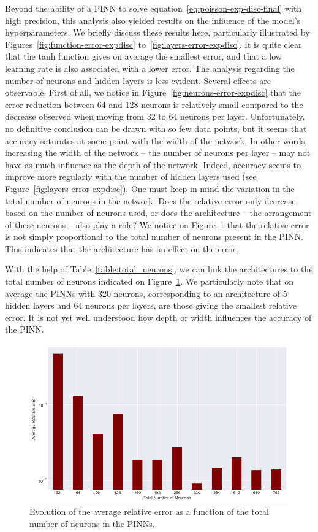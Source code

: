 Beyond the ability of a PINN to solve equation~\eqref{eq:poisson-exp-disc-final} with high precision, this analysis also yielded results on the influence of the model's hyperparameters. We briefly discuss these results here, particularly illustrated by Figures~\ref{fig:function-error-expdisc} to~\ref{fig:layers-error-expdisc}. It is quite clear that the tanh function gives on average the smallest error, and that a low learning rate is also associated with a lower error. The analysis regarding the number of neurons and hidden layers is less evident. Several effects are observable. First of all, we notice in Figure~\ref{fig:neurons-error-expdisc} that the error reduction between 64 and 128 neurons is relatively small compared to the decrease observed when moving from 32 to 64 neurons per layer. Unfortunately, no definitive conclusion can be drawn with so few data points, but it seems that accuracy saturates at some point with the width of the network. In other words, increasing the width of the network -- the number of neurons per layer -- may not have as much influence as the depth of the network. Indeed, accuracy seems to improve more regularly with the number of hidden layers used (see Figure~\ref{fig:layers-error-expdisc}). One must keep in mind the variation in the total number of neurons in the network. Does the relative error only decrease based on the number of neurons used, or does the architecture -- the arrangement of these neurons -- also play a role? We notice on Figure~\ref{fig:tot-neurons-error} that the relative error is not simply proportional to the total number of neurons present in the PINN. This indicates that the architecture has an effect on the error.

With the help of Table~\ref{table:total_neurons}, we can link the architectures to the total number of neurons indicated on Figure~\ref{fig:tot-neurons-error}. We particularly note that on average the PINNs with 320 neurons, corresponding to an architecture of 5 hidden layers and 64 neurons per layers, are those giving the smallest relative error. It is not yet well understood how depth or width influences the accuracy of the PINN.

\begin{figure}
\centering
\includegraphics[width=\textwidth]{imgs/tot-neurons-error.png}
\caption{Evolution of the average relative error as a function of the total number of neurons in the PINNs.}
\label{fig:tot-neurons-error}
\end{figure}

